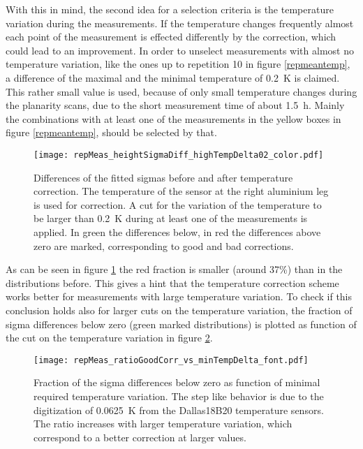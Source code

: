 \documentclass[
a4paper,                                %
twoside,                                %
BCOR1.4cm,                      %
10pt,                           %
headings=normal,                %
headsepline,                    %
clearplainpage, %
final,                                  %
div=14,
parskip=full,
openright,
bibliography=toc
]{scrreprt}
\begin{document}
With this in mind, the second idea for a selection criteria is the temperature variation during the measurements. If the temperature changes frequently almost each point of the measurement is effected differently by the correction, which could lead to an improvement. In order to unselect measurements with almost no temperature variation, like the ones up to repetition 10 in figure \ref{repmeantemp}, a difference of the maximal and the minimal temperature of \SI{0.2}{K} is claimed. This rather small value is used, because of only small temperature changes during the planarity scans, due to the short measurement time of about \SI{1.5}{\hour}. Mainly the combinations with at least one of the measurements in the yellow boxes in figure \ref{repmeantemp}, should be selected by that.

\begin{figure}[H]
	\centering
	\texttt{[image: repMeas\_heightSigmaDiff\_highTempDelta02\_color.pdf]}
	\caption{Differences of the fitted sigmas before and after temperature correction. The temperature of the sensor at the right aluminium leg is used for correction. A cut for the variation of the temperature to be larger than \SI{0.2}{K} during at least one of the measurements is applied. 
	In green the differences below, in red the differences above zero are marked, corresponding to good and bad corrections.
	}
	\label{largetempvar}
\end{figure}

As can be seen in figure \ref{largetempvar} the red fraction is smaller (around 37\%) than in the distributions before. This gives a hint that the temperature correction scheme works better for measurements with large temperature variation. To check if this conclusion holds also for larger cuts on the temperature variation, the fraction of sigma differences below zero (green marked distributions) is plotted as function of the cut on the temperature variation in figure \ref{ratiogoodcor}.

\begin{figure}[H]
	\centering
	\texttt{[image: repMeas\_ratioGoodCorr\_vs\_minTempDelta\_font.pdf]}
	\caption{Fraction of the sigma differences below zero as function of minimal required temperature variation. The step like behavior is due to the digitization of \SI{0.0625}{\K} from the Dallas18B20 temperature sensors. The ratio increases with larger temperature variation, which correspond to a better correction at larger values.}
	\label{ratiogoodcor}
\end{figure}
\end{document}
